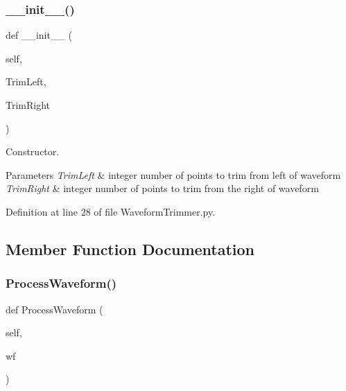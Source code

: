 \subsubsection{\texorpdfstring{\+\_\+\+\_\+init\+\_\+\+\_\+()}{\_\_init\_\_()}}
{\footnotesize\ttfamily def \+\_\+\+\_\+init\+\_\+\+\_\+ (\begin{DoxyParamCaption}\item[{}]{self,  }\item[{}]{Trim\+Left,  }\item[{}]{Trim\+Right }\end{DoxyParamCaption})}



Constructor. 


\begin{DoxyParams}{Parameters}
{\em Trim\+Left} & integer number of points to trim from left of waveform \\
\hline
{\em Trim\+Right} & integer number of points to trim from the right of waveform \\
\hline
\end{DoxyParams}


Definition at line 28 of file Waveform\+Trimmer.\+py.



\subsection{Member Function Documentation}
\mbox{\label{classSignalIntegrity_1_1TimeDomain_1_1Filters_1_1WaveformTrimmer_1_1WaveformTrimmer_ae09bec195c9cb1d5819e73b7be169b11}} 
\subsubsection{\texorpdfstring{Process\+Waveform()}{ProcessWaveform()}}
{\footnotesize\ttfamily def Process\+Waveform (\begin{DoxyParamCaption}\item[{}]{self,  }\item[{}]{wf }\end{DoxyParamCaption})}



